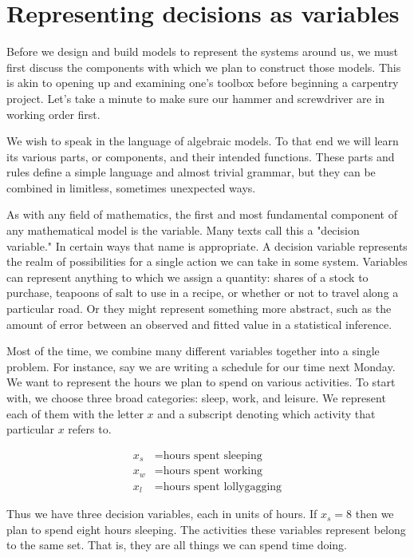 \section{Representing decisions as variables}

Before we design and build models to represent the systems around us, we must first discuss the components with which we plan to construct those models. This is akin to opening up and examining one's toolbox before beginning a carpentry project. Let's take a minute to make sure our hammer and screwdriver are in working order first.

We wish to speak in the language of algebraic models. To that end we will learn its various parts, or components, and their intended functions. These parts and rules define a simple language and almost trivial grammar, but they can be combined in limitless, sometimes unexpected ways.

As with any field of mathematics, the first and most fundamental component of any mathematical model is the variable. Many texts call this a "decision variable." In certain ways that name is appropriate. A decision variable represents the realm of possibilities for a single action we can take in some system. Variables can represent anything to which we assign a quantity: shares of a stock to purchase, teapoons of salt to use in a recipe, or whether or not to travel along a particular road. Or they might represent something more abstract, such as the amount of error between an observed and fitted value in a statistical inference.

Most of the time, we combine many different variables together into a single problem. For instance, say we are writing a schedule for our time next Monday. We want to represent the hours we plan to spend on various activities. To start with, we choose three broad categories: sleep, work, and leisure. We represent each of them with the letter $x$ and a subscript denoting which activity that particular $x$ refers to.

$$
\begin{aligned}
	x_s &= \text{hours spent sleeping} \\
	x_w &= \text{hours spent working} \\
	x_l &= \text{hours spent lollygagging}
\end{aligned}
$$

Thus we have three decision variables, each in units of hours. If $x_s = 8$ then we plan to spend eight hours sleeping. The activities these variables represent belong to the same set. That is, they are all things we can spend time doing.

